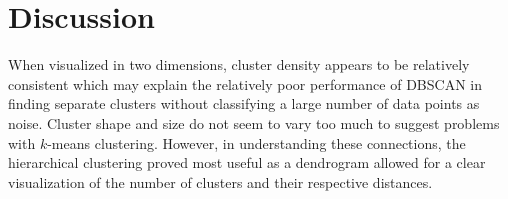 \documentclass{article}
\begin{document}
\section{Discussion}
\label{Discussion}
When visualized in two dimensions, cluster density appears to be relatively consistent which may explain the relatively poor performance of DBSCAN in finding separate clusters without classifying a large number of data points as noise. Cluster shape and size do not seem to vary too much to suggest problems with $k$-means clustering. However, in understanding these connections, the hierarchical clustering proved most useful as a dendrogram allowed for a clear visualization of the number of clusters and their respective distances.




\end{document}
